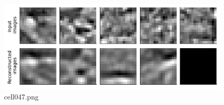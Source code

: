 \begin{figure}[ht]
	\centering
	\includegraphics[scale=0.8, max width=\linewidth]{./fig/energy-based-model/sparse-coding/cell047.png}
	\caption{cell047.png}
	\label{cell047.png}
\end{figure}